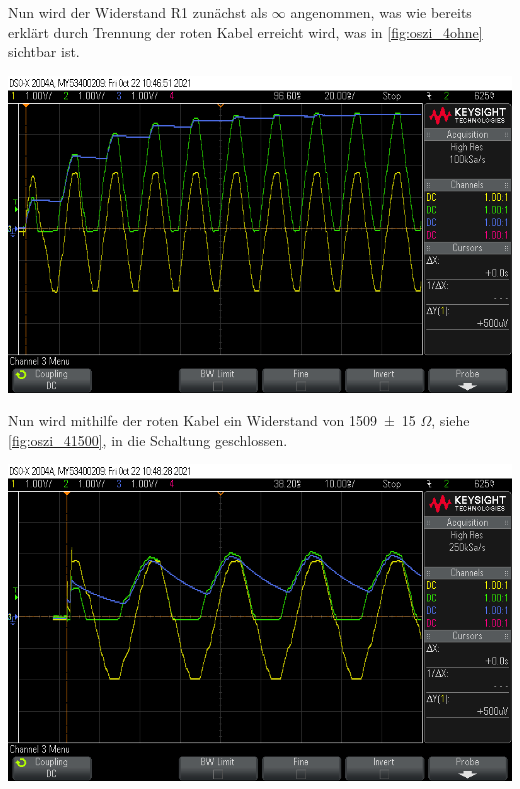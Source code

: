 \documentclass[11pt,ngerman]{scrartcl}
\begin{document}
Nun wird der Widerstand R1 zunächst als $\infty$ angenommen, was wie bereits erklärt durch Trennung der roten Kabel erreicht wird, was in \autoref{fig:oszi_4ohne} sichtbar ist.

\begin{center}
	\begin{minipage}[t]{0.8\textwidth}
		\includegraphics[width=\textwidth]{Halbleiter/scope_15}
		\label{fig:oszi_4ohne}
	\end{minipage}
\end{center}

Nun wird mithilfe der roten Kabel ein Widerstand von \SI{1509(15)}{} $\Omega$, siehe \autoref{fig:oszi_41500}, in die Schaltung geschlossen.

\begin{center}
	\begin{minipage}[t]{0.8\textwidth}
		\includegraphics[width=\textwidth]{Halbleiter/scope_16}
		\label{fig:oszi_41500}
	\end{minipage}
\end{center}
\end{document}
